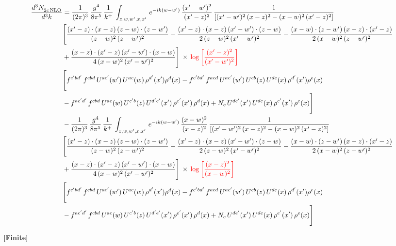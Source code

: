 \documentclass[9pt]{article}
\numberwithin{equation}{section}
\begin{document}
\begin{align}
    \frac{d^{3}N_{2c\,\rm NLO}^{\rm}}{d^{3}k}  & =  \frac{1}{(2\pi)^{3}}\, \frac{g^{4}}{8\pi^{5}}\,\frac{1}{k^{+}}\,\int_{z,w,w^{\prime},x,x'}\, e^{-ik(w-w^{\prime})}\,\frac{(x'-w')^{2}}{(x'-z)^{2}}\, \frac{1}{\left[(x'-w')^{2}\, (x-z)^{2} - (x-w)^{2}\, (x'-z)^{2}\right]} \notag \\ & \Bigg[\frac{(x'-z)\cdot (x-z)\, (z-w)\cdot (z-w')}{(z-w)^{2}\, (z-w')^{2}}-\frac{(x'-z)\cdot (x-z)\, (x'-w')\cdot (z-w)}{2\, (z-w)^{2}\, (x'-w')^{2}} -\frac{(x-w)\cdot (z-w')\, (x-z)\cdot (x'-z)}{2\, (x-w)^{2}\, (z-w')^{2}}\notag \\ & +\frac{(x-z)\cdot (x'-z)\, (x'-w')\cdot (x-w)}{4\, (x-w)^{2}\, (x'-w')^{2}}\Bigg]\,\times\, {\color{red}\log{\left[\frac{(x'-z)^{2}}{(x'-w')^{2}}\right]}} \notag \\ &  \Bigg[f^{c'bd'}\,f^{cbd}\, U^{ac'}(w')\,U^{ac}(w)\,\rho^{d'}(x')\rho^{d}(x)- f^{c'bd'}\,f^{acd}\,U^{ac'}(w')\,U^{cb}(z)\,U^{de}(x)\,\rho^{d'}(x')\rho^{e}(x) \notag \\ & -f^{ac'd'}\,f^{cbd}\,U^{ac}(w)\,U^{c'b}(z)\,U^{d'e'}(x')\,\rho^{e'}(x')\,\rho^{d}(x) +N_{c}\,U^{de'}(x')\,U^{de}(x)\,\rho^{e'}(x')\,\rho^{e}(x)\Bigg] \notag \\
& -\frac{1}{(2\pi)^{3}}\, \frac{g^{4}}{8\pi^{5}}\,\frac{1}{k^{+}}\,\int_{z,w,w^{\prime},x,x'}\, e^{-ik(w-w^{\prime})}\,\frac{(x-w)^{2}}{(x-z)^{2}}\, \frac{1}{\left[(x'-w')^{2}\, (x-z)^{2} - (x-w)^{2}\, (x'-z)^{2}\right]} \notag \\ & \Bigg[\frac{(x'-z)\cdot (x-z)\, (z-w)\cdot (z-w')}{(z-w)^{2}\, (z-w')^{2}}-\frac{(x'-z)\cdot (x-z)\, (x'-w')\cdot (z-w)}{2\, (z-w)^{2}\, (x'-w')^{2}} -\frac{(x-w)\cdot (z-w')\, (x-z)\cdot (x'-z)}{2\, (x-w)^{2}\, (z-w')^{2}}\notag \\ & +\frac{(x-z)\cdot (x'-z)\, (x'-w')\cdot (x-w)}{4\, (x-w)^{2}\, (x'-w')^{2}}\Bigg]\,\times\, {\color{red}\log{\left[\frac{(x-z)^{2}}{(x-w)^{2}}\right]}} \notag \\ &  \Bigg[f^{c'bd'}\,f^{cbd}\, U^{ac'}(w')\,U^{ac}(w)\,\rho^{d'}(x')\rho^{d}(x)- f^{c'bd'}\,f^{acd}\,U^{ac'}(w')\,U^{cb}(z)\,U^{de}(x)\,\rho^{d'}(x')\rho^{e}(x) \notag \\ & -f^{ac'd'}\,f^{cbd}\,U^{ac}(w)\,U^{c'b}(z)\,U^{d'e'}(x')\,\rho^{e'}(x')\,\rho^{d}(x) +N_{c}\,U^{de'}(x')\,U^{de}(x)\,\rho^{e'}(x')\,\rho^{e}(x)\Bigg]
\end{align}
\par\smallskip\noindent\textbf{[Finite]}\par\nobreak
\end{document}
